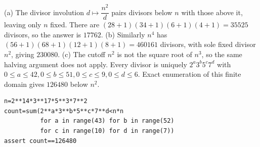 (a) The divisor involution $d\mapsto \dfrac{n^2}{d}$ pairs divisors below $n$ with those above it, leaving only $n$ fixed. There are $(28+1)(34+1)(6+1)(4+1)=35525$ divisors, so the answer is $\boxed{17762}$. (b) Similarly $n^4$ has $(56+1)(68+1)(12+1)(8+1)=460161$ divisors, with sole fixed divisor $n^2$, giving $\boxed{230080}$. (c) The cutoff $n^2$ is not the square root of $n^3$, so the same halving argument does not apply. Every divisor is uniquely $2^a3^b5^c7^d$ with $0\le a\le42,0\le b\le51,0\le c\le9,0\le d\le6$. Exact enumeration of this finite domain gives $\boxed{126480}$ below $n^2$.
\begin{verbatim}
n=2**14*3**17*5**3*7**2
count=sum(2**a*3**b*5**c*7**d<n*n
          for a in range(43) for b in range(52)
          for c in range(10) for d in range(7))
assert count==126480
\end{verbatim}
